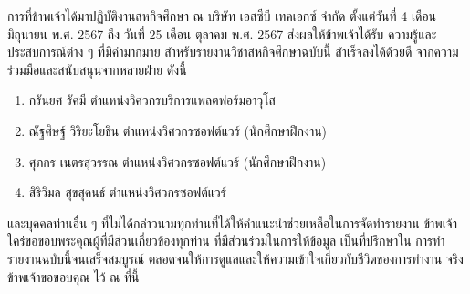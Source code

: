 \begin{acknowledgments}
    การที่ข้าพเจ้าได้มาปฏิบัติงานสหกิจศึกษา ณ บริษัท เอสซีบี เทคเอกซ์ จำกัด ตั้งแต่วันที่ 4 เดือน มิถุนายน
     พ.ศ. 2567 ถึง วันที่ 25 เดือน ตุลาคม พ.ศ. 2567 ส่งผลให้ข้าพเจ้าได้รับ
    ความรู้และประสบการณ์ต่าง ๆ ที่มีค่ามากมาย สำหรับรายงานวิชาสหกิจศึกษาฉบับนี้ สำเร็จลงได้ด้วยดี
    จากความร่วมมือและสนับสนุนจากหลายฝ่าย ดังนี้
    \begin{enumerate}
        \item กรันยศ รัศมี ตำแหน่งวิศวกรบริการแพลตฟอร์มอาวุโส
        \item ณัฐศิษฐ์ วิริยะโยธิน ตำแหน่งวิศวกรซอฟต์แวร์ (นักศึกษาฝึกงาน)
        \item ศุภกร เนตรสุวรรณ ตำแหน่งวิศวกรซอฟต์แวร์ (นักศึกษาฝึกงาน)
        \item สิริวิมล สุขสุคนธ์ ตำแหน่งวิศวกรซอฟต์แวร์
    \end{enumerate}
    และบุคคลท่านอื่น ๆ ที่ไม่ได้กล่าวนามทุกท่านที่ได้ให้คำแนะนำช่วยเหลือในการจัดทำรายงาน
    ข้าพเจ้าใคร่ขอขอบพระคุณผู้ที่มีส่วนเกี่ยวข้องทุกท่าน ที่มีส่วนร่วมในการให้ข้อมูล เป็นที่ปรึกษาใน
    การทำรายงานฉบับนี้จนเสร็จสมบูรณ์ ตลอดจนให้การดูแลและให้ความเข้าใจเกี่ยวกับชีวิตของการทำงาน
    จริง ข้าพเจ้าขอขอบคุณ ไว้ ณ ที่นี้

\end{acknowledgments}%
\fi %

\contentspage

\ifproject
\figurelistpage
\tablelistpage
\fi %



